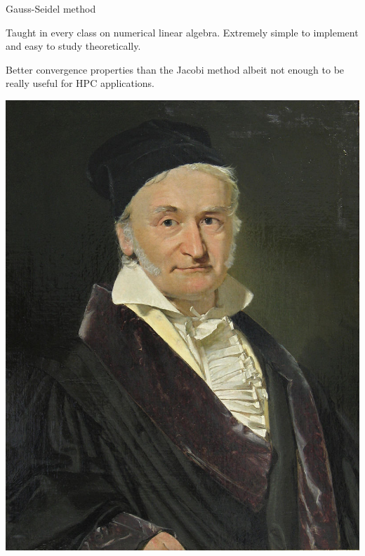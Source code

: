 \documentclass[aspectratio=169]{beamer}
\begin{document}
\begin{frame}[t, c]{Gauss-Seidel method}{}
  \begin{minipage}{.68\textwidth}
    \begin{overprint}
      Taught in every class on numerical linear algebra.
      Extremely simple to implement and easy to study theoretically.

      Better convergence properties than the Jacobi method albeit not enough to be really useful for HPC applications.
    \end{overprint}
  \end{minipage}%
  \hfill
  \begin{minipage}{.28\textwidth}
    \centering
    \includegraphics[height=.4\textheight]{peinture_gauss}

    \bigskip


\end{minipage}
\end{frame}
\end{document}
